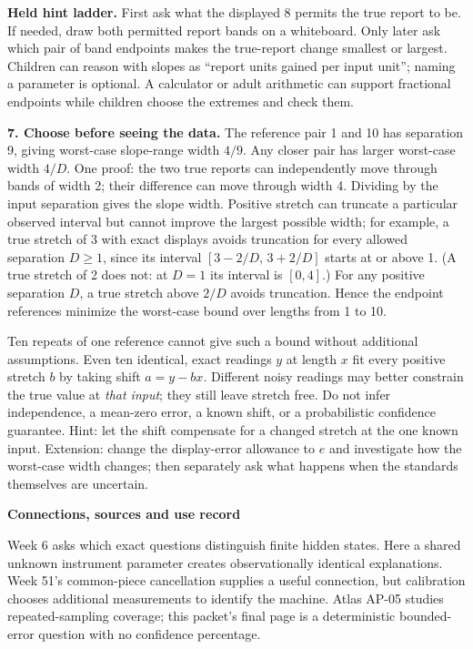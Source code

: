 \documentclass[letterpaper,11pt]{article}
\newcommand{\topic}[1]{\par\medskip\textbf{#1}\par}
\begin{document}
\textbf{Held hint ladder.} First ask what the displayed 8 permits the true report to be. If needed, draw both permitted report bands on a whiteboard. Only later ask which pair of band endpoints makes the true-report change smallest or largest. Children can reason with slopes as ``report units gained per input unit''; naming a parameter is optional. A calculator or adult arithmetic can support fractional endpoints while children choose the extremes and check them.

\textbf{7. Choose before seeing the data.} The reference pair 1 and 10 has separation 9, giving worst-case slope-range width $4/9$. Any closer pair has larger worst-case width $4/D$. One proof: the two true reports can independently move through bands of width 2; their difference can move through width 4. Dividing by the input separation gives the slope width. Positive stretch can truncate a particular observed interval but cannot improve the largest possible width; for example, a true stretch of 3 with exact displays avoids truncation for every allowed separation $D\ge1$, since its interval $[3-2/D,\,3+2/D]$ starts at or above 1. (A true stretch of 2 does not: at $D=1$ its interval is $[0,4]$.) For any positive separation $D$, a true stretch above $2/D$ avoids truncation. Hence the endpoint references minimize the worst-case bound over lengths from 1 to 10.

Ten repeats of one reference cannot give such a bound without additional assumptions. Even ten identical, exact readings $y$ at length $x$ fit every positive stretch $b$ by taking shift $a=y-bx$. Different noisy readings may better constrain the true value at \emph{that input}; they still leave stretch free. Do not infer independence, a mean-zero error, a known shift, or a probabilistic confidence guarantee. Hint: let the shift compensate for a changed stretch at the one known input. Extension: change the display-error allowance to $e$ and investigate how the worst-case width changes; then separately ask what happens when the standards themselves are uncertain.

\topic{Connections, sources and use record}
Week 6 asks which exact questions distinguish finite hidden states. Here a shared unknown instrument parameter creates observationally identical explanations. Week 51's common-piece cancellation supplies a useful connection, but calibration chooses additional measurements to identify the machine. Atlas AP-05 studies repeated-sampling coverage; this packet's final page is a deterministic bounded-error question with no confidence percentage.
\end{document}
